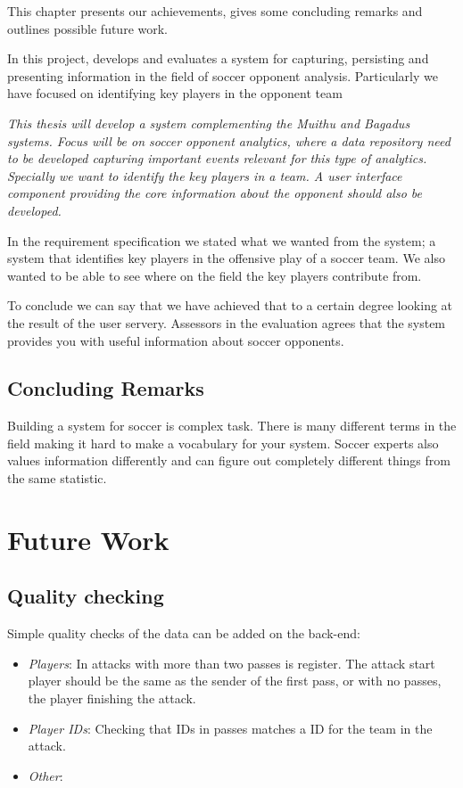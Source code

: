 This chapter presents our achievements, gives some concluding remarks and outlines possible future work.

In this project, develops and evaluates a system for capturing, persisting and presenting information in the field of soccer opponent analysis. Particularly we have focused on identifying key players in the opponent team 

\textit{This thesis will develop a system complementing the Muithu and Bagadus systems. Focus will be on soccer opponent analytics, where a data repository need to be developed capturing important events relevant for this type of analytics. Specially we want to identify the key players in a team. A user interface component providing the core information about the opponent should also be developed.}

In the requirement specification we stated what we wanted from the system; a system that identifies key players in the offensive play of a soccer team. We also wanted to be able to see where on the field the key players contribute from.

To conclude we can say that we have achieved that to a certain degree looking at the result of the user servery. Assessors in the evaluation agrees that the system provides you with useful information about soccer opponents. 

\subsection{Concluding Remarks}

Building a system for soccer is complex task. There is many different terms in the field making it hard to make a vocabulary for your system. Soccer experts also values information differently and can figure out completely different things from the same statistic. 


\section{Future Work}

\subsection{Quality checking}

Simple quality checks of the data can be added on the back-end:

\begin{itemize}
\item \emph{Players}: In attacks with more than two passes is register. The attack start player should be the same as the sender of the first pass, or with no passes, the player finishing the attack. 
\item \emph{Player IDs}: Checking that IDs in passes matches a ID for the team in the attack.
\item \emph{Other}: 
\end{itemize}

